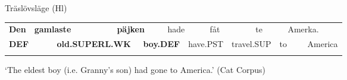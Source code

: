\begin{styleExLtrTblii}
Träslövsläge (Hl)

\end{styleExLtrTblii}

\begin{tabular}{llllllllllllll}
\lsptoprule
{\bfseries Den} & \multicolumn{2}{l}{{\bfseries gamlaste}

} & \multicolumn{2}{l}{{\bfseries päjken}

} & \multicolumn{2}{l}{hade

} & \multicolumn{2}{l}{fåt

} & \multicolumn{2}{l}{te

} & \multicolumn{2}{l}{Amerka.

} & \\
\multicolumn{2}{l}{{\bfseries DEF}

} & \multicolumn{2}{l}{{\bfseries old.SUPERL.WK}

} & \multicolumn{2}{l}{{\bfseries boy.DEF}

} & \multicolumn{2}{l}{have.PST

} & \multicolumn{2}{l}{travel.SUP

} & \multicolumn{2}{l}{to

} & \multicolumn{2}{l}{America

}\\
\lspbottomrule
\end{tabular}

\begin{styleTranslation}
‘The eldest boy (i.e. Granny’s son) had gone to America.’ (Cat Corpus)

\end{styleTranslation}


